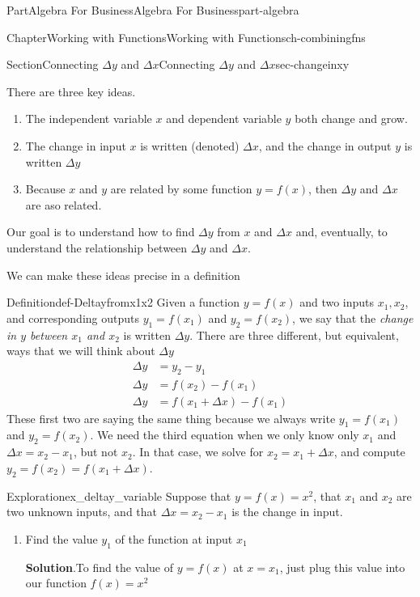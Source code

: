 \documentclass[oneside,10pt,]{tufte-book}
\newcommand{\blocktitlefont}{\relax}
\numberwithin{equation}{chapter}
\newcommand{\amp}{&}
\begin{document}
\begin{partptx}{Part}{Algebra For Business}{}{Algebra For Business}{}{}{part-algebra}
\begin{chapterptx}{Chapter}{Working with Functions}{}{Working with Functions}{}{}{ch-combiningfns}
\begin{sectionptx}{Section}{\textasteriskcentered{}Connecting \(\Delta y\) and \(\Delta x\)}{}{\textasteriskcentered{}Connecting \(\Delta y\) and \(\Delta x\)}{}{}{sec-changeinxy}
\par
There are three key ideas.%
\begin{enumerate}
\item{}The independent variable \(x\) and dependent variable \(y\) both change and grow.%
\item{}The change in input \(x\) is written (denoted) \(\Delta x\), and the change in output \(y\) is written \(\Delta y\)%
\item{}Because \(x\) and \(y\) are related by some function \(y=f(x)\), then \(\Delta y\) and \(\Delta x\) are aso related.%
\end{enumerate}
Our goal is to understand how to find \(\Delta y\) from \(x\) and \(\Delta x\) and, eventually, to understand the relationship between \(\Delta y\) and \(\Delta x\).%
\par
We can make these ideas precise in a definition%
\begin{definition}{Definition}{}{def-Deltayfromx1x2}%
Given a function \(y=f(x)\) and two inputs \(x_1,x_2\), and corresponding outputs \(y_1 = f(x_1)\) and \(y_2=f(x_2)\), we say that the \emph{change in \(y\) between \(x_1\) and \(x_2\)} is written \(\Delta y\). There are three different, but equivalent, ways that we will think about \(\Delta y\)%
\begin{align}
\Delta y \amp = y_2 - y_1 \label{def-Deltayfromx1x2-1-1-8-1}\\
\Delta y \amp = f(x_2) - f(x_1)\label{def-Deltayfromx1x2-1-1-8-2}\\
\Delta y \amp = f(x_1 + \Delta x) - f(x_1)\label{def-Deltayfromx1x2-1-1-8-3}
\end{align}
These first two are saying the same thing because we always write \(y_1 = f(x_1)\) and \(y_2=f(x_2)\). We need the third equation when we only know only \(x_1\) and \(\Delta x = x_2-x_1\), but not \(x_2\).  In that case, we solve for \(x_2 = x_1 + \Delta x\), and compute \(y_2 = f(x_2) = f(x_1+\Delta x)\).%
\end{definition}
\begin{exploration}{Exploration}{}{ex_deltay_variable}%
Suppose that \(y = f(x) = x^2\), that \(x_1\) and \(x_2\) are two unknown inputs, and that \(\Delta x = x_2-x_1\) is the change in input.%
\begin{enumerate}[font=\bfseries,label=(\alph*),ref=\alph*]%
\item{}Find the value \(y_1\) of the function at input \(x_1\)%
\par\smallskip%
\noindent\textbf{\blocktitlefont Solution}.\hypertarget{ex_deltay_variable-2-2}{}\quad{}To find the value of \(y=f(x)\) at \(x=x_1\), just plug this value into our function \(f(x)=x^2\)%

\end{enumerate}
\end{exploration}
\end{sectionptx}
\end{chapterptx}
\end{partptx}
\end{document}
